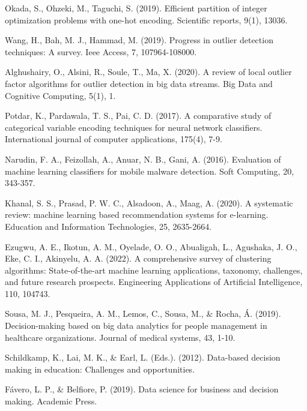 \documentclass{book}
\begin{document}
\begin{thebibliography}{9}
    Okada, S., Ohzeki, M., Taguchi, S. (2019). Efficient partition of integer optimization problems with one-hot encoding. Scientific reports, 9(1), 13036.
    
    Wang, H., Bah, M. J., Hammad, M. (2019). Progress in outlier detection techniques: A survey. Ieee Access, 7, 107964-108000.

    Alghushairy, O., Alsini, R., Soule, T., Ma, X. (2020). A review of local outlier factor algorithms for outlier detection in big data streams. Big Data and Cognitive Computing, 5(1), 1.
    
    Potdar, K., Pardawala, T. S., Pai, C. D. (2017). A comparative study of categorical variable encoding techniques for neural network classifiers. International journal of computer applications, 175(4), 7-9.

    Narudin, F. A., Feizollah, A., Anuar, N. B., Gani, A. (2016). Evaluation of machine learning classifiers for mobile malware detection. Soft Computing, 20, 343-357.
    
    Khanal, S. S., Prasad, P. W. C., Alsadoon, A., Maag, A. (2020). A systematic review: machine learning based recommendation systems for e-learning. Education and Information Technologies, 25, 2635-2664.

    Ezugwu, A. E., Ikotun, A. M., Oyelade, O. O., Abualigah, L., Agushaka, J. O., Eke, C. I.,  Akinyelu, A. A. (2022). A comprehensive survey of clustering algorithms: State-of-the-art machine learning applications, taxonomy, challenges, and future research prospects. Engineering Applications of Artificial Intelligence, 110, 104743.
    
    Sousa, M. J., Pesqueira, A. M., Lemos, C., Sousa, M., \& Rocha, Á. (2019). Decision-making based on big data analytics for people management in healthcare organizations. Journal of medical systems, 43, 1-10.

    Schildkamp, K., Lai, M. K., \& Earl, L. (Eds.). (2012). Data-based decision making in education: Challenges and opportunities.

    Fávero, L. P., \& Belfiore, P. (2019). Data science for business and decision making. Academic Press.

\end{thebibliography}

    
\end{document}
